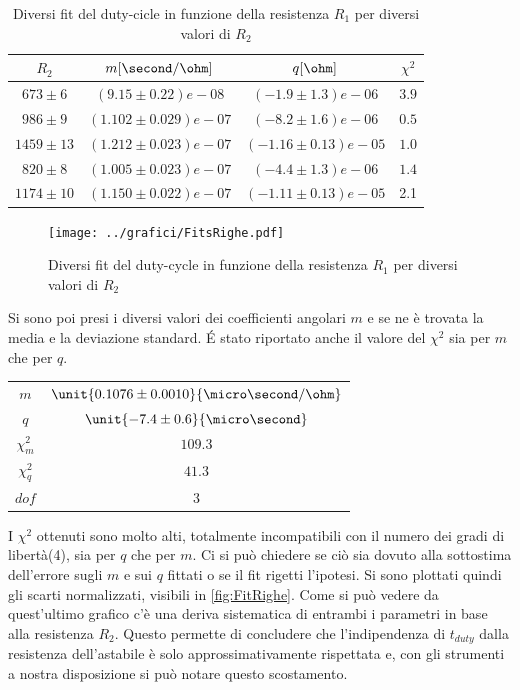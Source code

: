 \documentclass[a4paper,10pt]{article}
\begin{document}
\begin{table}[H]
\centering
\begin{tabular}{c|c|c|c} 
$R_2$ & $m [\second/\ohm]$ & $q [\ohm]$ & $\chi^2$\\
\hline
$673 \pm 6$ & $(9.15 \pm 0.22) e-08$ & $(-1.9 \pm 1.3) e-06$ & $3.9$\\
$986\pm 9$ & $(1.102 \pm 0.029) e-07$ & $(-8.2\pm 1.6) e-06$ & $0.5$\\
$1459 \pm 13$ & $(1.212\pm 0.023) e-07$ & $(-1.16 \pm 0.13) e-05$ & $1.0$\\
$820 \pm 8$ & $(1.005 \pm 0.023) e-07$ & $(-4.4\pm 1.3) e-06$ & $1.4$\\
$1174 \pm 10$ & $(1.150 \pm 0.022) e-07$ & $(-1.11 \pm 0.13) e-05$ & 2.1\\
\end{tabular}
\caption{Diversi fit del duty-cicle in funzione della resistenza $R_1$ per diversi valori di $R_2$}
\label{tab:DutyFit}
\end{table}

\begin{figure}[H]
	\centering
	\texttt{[image: ../grafici/FitsRighe.pdf]}
	\caption{Diversi fit del duty-cycle in funzione della resistenza $R_1$ per diversi valori di $R_2$}
	\label{fig:FitsRighe}
\end{figure}

Si sono poi presi i diversi valori dei coefficienti angolari $m$ e se ne è trovata la media e la deviazione standard. \'E stato riportato anche il valore del $\chi^2$ sia per $m$ che per $q$.


\begin{table}[H]
\centering
\begin{tabular}{c|c} 
$m$&$\unit{0.1076 \pm 0.0010}{\micro\second/\ohm}$ \\
$q$&$\unit{-7.4 \pm 0.6}{\micro\second}$ \\
$\chi^2_m$&$109.3$\\
$\chi^2_q$&$41.3$\\
$dof$&$3$\\
\end{tabular}
\end{table}


I $\chi^2$ ottenuti sono molto alti, totalmente incompatibili con il numero dei gradi di libertà(4), sia per $q$ che per $m$. Ci si può chiedere se ciò sia dovuto alla sottostima dell'errore sugli $m$ e sui $q$ fittati o se il fit rigetti l'ipotesi. 
Si sono plottati quindi gli scarti normalizzati, visibili in  \cref{fig:FitRighe}.
Come si può vedere da quest'ultimo grafico c'è una deriva sistematica di entrambi i parametri in base alla resistenza $R_2$. Questo permette di concludere che l'indipendenza di $t_{duty}$ dalla resistenza dell'astabile è solo approssimativamente rispettata e, con gli strumenti a nostra disposizione si può notare questo scostamento. 
\end{document}
